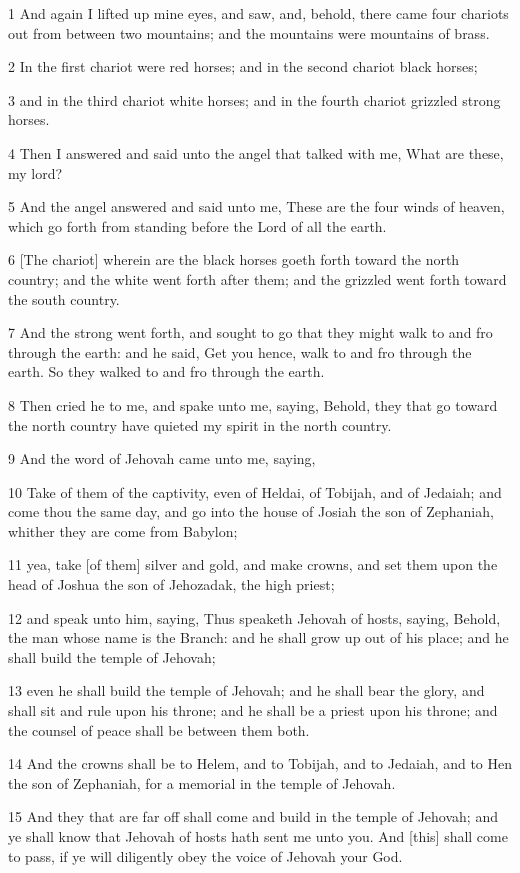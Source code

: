 \par 1 And again I lifted up mine eyes, and saw, and, behold, there came four chariots out from between two mountains; and the mountains were mountains of brass.
\par 2 In the first chariot were red horses; and in the second chariot black horses;
\par 3 and in the third chariot white horses; and in the fourth chariot grizzled strong horses.
\par 4 Then I answered and said unto the angel that talked with me, What are these, my lord?
\par 5 And the angel answered and said unto me, These are the four winds of heaven, which go forth from standing before the Lord of all the earth.
\par 6 [The chariot] wherein are the black horses goeth forth toward the north country; and the white went forth after them; and the grizzled went forth toward the south country.
\par 7 And the strong went forth, and sought to go that they might walk to and fro through the earth: and he said, Get you hence, walk to and fro through the earth. So they walked to and fro through the earth.
\par 8 Then cried he to me, and spake unto me, saying, Behold, they that go toward the north country have quieted my spirit in the north country.
\par 9 And the word of Jehovah came unto me, saying,
\par 10 Take of them of the captivity, even of Heldai, of Tobijah, and of Jedaiah; and come thou the same day, and go into the house of Josiah the son of Zephaniah, whither they are come from Babylon;
\par 11 yea, take [of them] silver and gold, and make crowns, and set them upon the head of Joshua the son of Jehozadak, the high priest;
\par 12 and speak unto him, saying, Thus speaketh Jehovah of hosts, saying, Behold, the man whose name is the Branch: and he shall grow up out of his place; and he shall build the temple of Jehovah;
\par 13 even he shall build the temple of Jehovah; and he shall bear the glory, and shall sit and rule upon his throne; and he shall be a priest upon his throne; and the counsel of peace shall be between them both.
\par 14 And the crowns shall be to Helem, and to Tobijah, and to Jedaiah, and to Hen the son of Zephaniah, for a memorial in the temple of Jehovah.
\par 15 And they that are far off shall come and build in the temple of Jehovah; and ye shall know that Jehovah of hosts hath sent me unto you. And [this] shall come to pass, if ye will diligently obey the voice of Jehovah your God.


